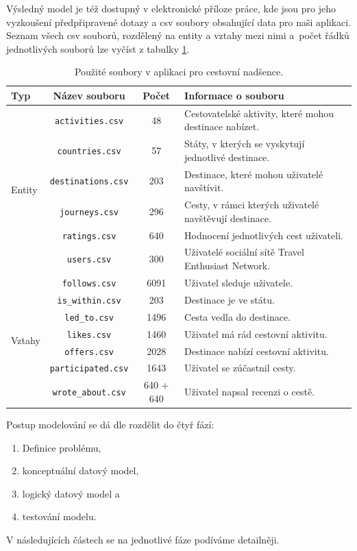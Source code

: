 \documentclass[
  program=infoi,
  biblatex=true,
  figures=true,
  glossaries=false,
  index,
  sourcecodes=true
]{kidiplom}
\begin{document}
Výsledný model je též dostupný v elektronické příloze práce, kde jsou pro jeho vyzkoušení předpřipravené dotazy a csv soubory obsahující data pro naši aplikaci. Seznam všech csv souborů, rozdělený na entity a vztahy mezi nimi a~počet řádků jednotlivých souborů lze vyčíst z tabulky \ref{tab:TravelEnthusiastNetwork-csv}.

\begin{table}[h]
\caption{Použité soubory v aplikaci pro cestovní nadšence.}
\label{tab:TravelEnthusiastNetwork-csv}
\begin{tabularx}{\textwidth}{ | l | c | c | X | }
 \hline
 \textbf{Typ} & \textbf{Název souboru} & \textbf{Počet} & \textbf{Informace o souboru} \\
 \hline \hline
 \multirow{6}{*}{Entity} & \texttt{activities.csv} & 48 & Cestovatelské aktivity, které mohou destinace nabízet. \\
 & \texttt{countries.csv} & 57 & Státy, v kterých se vyskytují jednotlivé destinace.\\
 & \texttt{destinations.csv} & 203 & Destinace, které mohou uživatelé navštívit. \\
 & \texttt{journeys.csv} & 296 & Cesty, v rámci kterých uživatelé navštěvují destinace. \\
 & \texttt{ratings.csv} & 640 & Hodnocení jednotlivých cest uživateli.\\
 & \texttt{users.csv} & 300 & Uživatelé sociální sítě Travel Enthusiast Network.\\
 \hline
 \multirow{8}{*}{Vztahy} & \texttt{follows.csv} & 6091 & Uživatel sleduje uživatele. \\
 & \texttt{is\_within.csv} & 203 & Destinace je ve státu. \\
 & \texttt{led\_to.csv} & 1496 & Cesta vedla do destinace.\\
 & \texttt{likes.csv} & 1460 & Uživatel má rád cestovní aktivitu. \\
 & \texttt{offers.csv} & 2028 & Destinace nabízí cestovní aktivitu.\\
 & \texttt{participated.csv} & 1643 & Uživatel se zúčastnil cesty. \\
 & \texttt{wrote\_about.csv} & 640 + 640 & Uživatel napsal recenzi o cestě. \\
 \hline
\end{tabularx}
\end{table}
\pagebreak
Postup modelování se dá dle \cite{inAction} rozdělit do čtyř fází:
\begin{enumerate}
  \item Definice problému,
  \item konceptuální datový model,
  \item logický datový model a
  \item testování modelu.
\end{enumerate}
V následujících částech se na jednotlivé fáze podíváme detailněji. 
\end{document}
